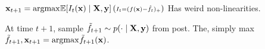 \begin{definition}[EI]
    \(\vb{x}_{t+1} = \text{argmax}_{} \mathbb{E}[I_t(\vb{x}) \mid \vb{X}, \vb{y}] \, ({\scriptstyle I_t = (f(\vb{x}) - \hat f_t)_+})\)
    Has weird non-linearities.
\end{definition}

\begin{definition}
    At time \(t+1\), sample \(\tilde f_{t+1} \sim p(\cdot \mid \vb{X}, \vb{y})\) from post. The, simply max \(\tilde f_{t+1}, \vb{x}_{t+1} = \text{argmax}_{} \tilde f_{t+1}(\vb{x})\).
\end{definition}

